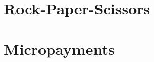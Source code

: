\documentclass{article}
\begin{document}
\javastyle

\section{Rock-Paper-Scissors}



\section{Micropayments}


\end{document}
